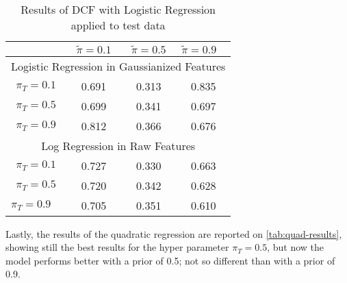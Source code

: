 \documentclass[12pt, twocolumn]{article}
\begin{document}
\begin{table}[h]
\caption{\label{tab:lreg-results}Results of DCF with Logistic Regression applied to test data}
\begin{center}
\begin{tabular}{cccc}
\hline
\multicolumn{1}{l}{} & \textbf{$\tilde{\pi } = 0.1$} & \textbf{$\tilde{\pi } = 0.5$} & \multicolumn{1}{l}{\textbf{$\tilde{\pi}  = 0.9$}} \\ \hline
\multicolumn{4}{c}{Logistic Regression in Gaussianized Features} \\ \hline
\multicolumn{1}{c|}{$\pi_T = 0.1$}   & 0.691   & 0.313  & 0.835  \\
\multicolumn{1}{c|}{$\pi_T = 0.5$}   & 0.699   & 0.341  & 0.697  \\
\multicolumn{1}{c|}{$\pi_T = 0.9$}   & 0.812   & 0.366  & 0.676  \\ \hline
\multicolumn{4}{c}{Log Regression in Raw Features}               \\ \hline
\multicolumn{1}{c|}{$\pi_T = 0.1$}   & 0.727   & 0.330  & 0.663  \\
\multicolumn{1}{c|}{$\pi_T = 0.5$}   & 0.720   & 0.342  & 0.628  \\
\multicolumn{1}{l|}{$\pi_T = 0.9$}   & 0.705   & 0.351  & 0.610  \\ \hline
\end{tabular}
\end{center}
\end{table}

Lastly, the results of the quadratic regression are reported on \ref{tab:quad-results}, showing still the best results for the hyper parameter $\pi_T=0.5$, but now the model
performs better with a prior of 0.5; not so different than with a prior of 0.9.
\end{document}
